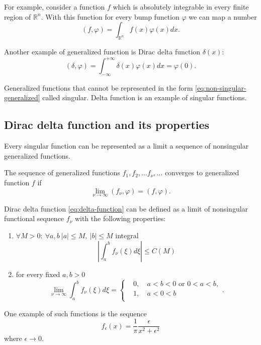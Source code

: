 \documentclass[11pt]{article}
\newenvironment{definition}[1][Definition]{\begin{trivlist}
\item[\hskip \labelsep {\bfseries #1}]}{\end{trivlist}}
\begin{document}
For example, consider a function $f$ which is absolutely integrable in every finite region of $\mathbb{R}^n$. With this function for every bump function $\varphi$ we can map a number 
\begin{equation}
(f, \varphi) = \int_{\mathbb{R}^n} f(x)\varphi(x) dx. \label{eq:non-singular-generalized}
\end{equation}

Another example of generalized function is Dirac delta function $\delta(x)$:
\begin{equation}
(\delta, \varphi) = \int_{-\infty}^{+\infty} \delta(x)\varphi(x) dx = \varphi(0). \label{eq:delta-function}
\end{equation}

Generalized functions that cannot be represented in the form \eqref{eq:non-singular-generalized} called singular. Delta function is an example of singular functions.

\subsection{Dirac delta function and its properties}

Every singular function can be represented as a limit a sequence of nonsingular generalized functions.
\begin{definition}
The sequence of generalized functions $f_1, f_2,\ldots f_\nu,\ldots$ converges to generalized function $f$ if
\[
\lim_{\nu\to\infty} (f_\nu, \varphi) = (f, \varphi).
\]
\end{definition}

Dirac delta function \eqref{eq:delta-function} can be defined as a limit of nonsingular functional sequence $f_\nu$ with the following properties:
\begin{enumerate}
\item $\forall M > 0:\ \forall a, b\ |a| \leq M,\ |b| \leq M$ integral 
\[
 \left| \int_a^b f_\nu(\xi)d\xi \right| \leq C(M)
\]
\item for every fixed $a, b > 0$
\[
\lim_{\nu\to\infty} \int_a^bf_\nu(\xi)d\xi = \left\{
\begin{aligned}
&0,&\ a < b < 0 \mbox{ or } 0 < a < b,\\
&1,&\ a < 0 < b\\
\end{aligned} \right. .
\]
\end{enumerate}
One example of such functions is the sequence 
\[
f_\epsilon(x) = \dfrac{1}{\pi} \dfrac{\epsilon}{x^2 + \epsilon^2}
\]
where $\epsilon\to 0$.
\end{document}
